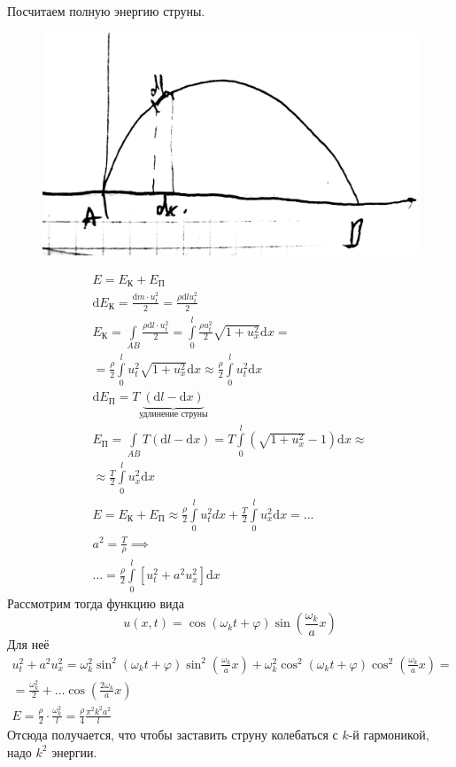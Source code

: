 Посчитаем полную энергию струны.

\begin{figure}[H]
\includegraphics[width=\textwidth]{2}
\end{figure}
\[
	\begin{aligned}
	E = E_\text{К}+E_\text{П} \\
	\mathrm{d}E_\text{К} = \frac{\mathrm{d}m \cdot u_t^2}{2} = \frac{\rho \mathrm{d}l u_t^2}{2} \\
	E_\text{К} = \int\limits_{AB} \frac{\rho \mathrm{d}l \cdot u_t^2}{2} = \int\limits_0^l \frac{\rho u_t^2}{2} \sqrt{1+u_x^2} \mathrm{d}x = \\
	= \frac{\rho}{2} \int\limits_0^l u_t^2 \sqrt{1+u_x^2} \mathrm{d}x \approx \frac{\rho}{2} \int\limits_0^l u_t^2 \mathrm{d}x \\
	\mathrm{d} E_\text{П} = T \underbrace{\left( \mathrm{d}l-\mathrm{d}x\right)}_{\text{удлинение струны}} \\
	E_\text{П} = \int\limits_{AB} T(\mathrm{d}l-\mathrm{d}x) = T \int\limits_0^l \left( \sqrt{1+u_x^2} - 1\right)\mathrm{d}x \approx \\
	\approx \frac{T}{2} \int\limits_0^l u_x^2 \mathrm{d}x \\
	E = E_\text{К} + E_\text{П} \approx \frac{\rho}{2} \int\limits_0^l u_t^2 dx + \frac{T}{2} \int\limits_0^l u_x^2 \mathrm{d}x = \dots\\
	a^2 = \frac{T}{\rho} \implies \\
	\dots = \frac{\rho}{2} \int\limits_0^l \left[ u_t^2 + a^2 u_x^2\right] \mathrm{d}x
\end{aligned}
\]
Рассмотрим тогда функцию вида
\[
	u(x,t) = \cos \left( \omega_k t + \varphi\right) \sin \left( \frac{\omega_k}{a} x\right)
\]
Для неё
\[
	\begin{aligned}
	u_t^2 + a^2 u_x^2 = \omega_k^2 \sin^2 \left( \omega_k t + \varphi\right) \sin^2 \left( \frac{\omega_k}{a} x\right) + \omega_k^2 \cos^2 \left( \omega_k t + \varphi\right)\cos^2 \left( \frac{\omega_k}{a} x\right) = \\
	= \frac{\omega_k^2}{2} + \dots \cos \left( \frac{2 \omega_k}{a} x\right) \\
	E = \frac{\rho}{2} \cdot \frac{\omega_k^2} l = \frac{\rho}{4} \frac{\pi^2 k^2 a^2}{l}
\end{aligned}
\]
Отсюда получается, что чтобы заставить струну колебаться с $k$-й гармоникой, надо $k^2$ энергии.
